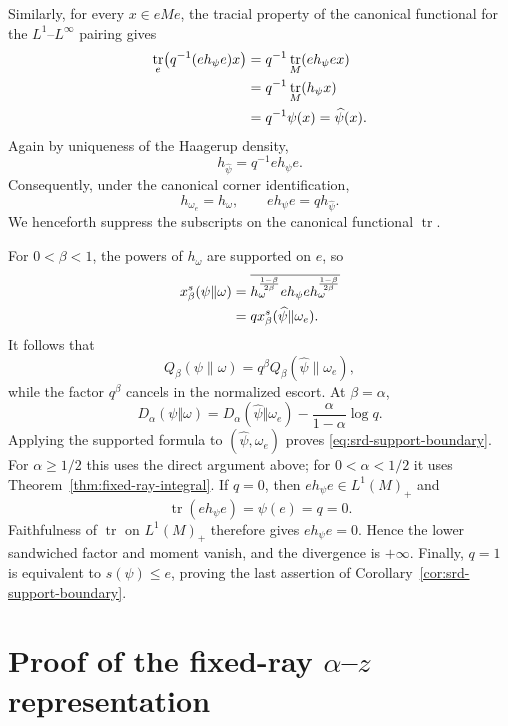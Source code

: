 \documentclass[12pt]{article}
\numberwithin{equation}{section}
\theoremstyle{definition}
\theoremstyle{remark}
\newcommand{\?}{\overset{?}{=}}
\DeclareMathOperator{\tr}{tr}
\begin{document}
Similarly, for every $x\in eMe$, the tracial property of the canonical
functional for the $L^1$--$L^\infty$ pairing gives
\begin{align}
  \tr_e\!\left(q^{-1}(e h_\psi e)x\right)
  &=
  q^{-1}\tr_M(eh_\psi e x) \notag\\
  &=
  q^{-1}\tr_M(h_\psi x) \notag\\
  &=
  q^{-1}\psi(x)
  =
  \widehat\psi(x).
  \label{eq:corner-density-pairing}
\end{align}
Again by uniqueness of the Haagerup density,
\[
  h_{\widehat\psi}=q^{-1}e h_\psi e.
\]
Consequently, under the canonical corner identification,
\begin{equation}
  h_{\omega_e}=h_\omega,
  \qquad
  e h_\psi e=q h_{\widehat\psi}.
  \label{eq:corner-density-scaling}
\end{equation}
We henceforth suppress the subscripts on the canonical functional $\tr$.

For $0<\beta<1$, the powers of $h_\omega$ are supported on $e$, so
\begin{align}
  x_\beta^s(\psi\|\omega)
  &=\overline{
  h_\omega^{\frac{1-\beta}{2\beta}}
  e h_\psi e
  h_\omega^{\frac{1-\beta}{2\beta}}}\notag\\
  &=q x_\beta^s(\widehat\psi\|\omega_e).
  \label{eq:corner-srd-factor}
\end{align}
It follows that
\begin{equation}
  Q_\beta(\psi\|\omega)
  =q^\beta Q_\beta(\widehat\psi\|\omega_e),
  \label{eq:corner-srd-moment}
\end{equation}
while the factor $q^\beta$ cancels in the normalized escort.  At
$\beta=\alpha$,
\begin{equation}
  D_\alpha(\psi\Vert\omega)
  =D_\alpha(\widehat\psi\Vert\omega_e)
   -\frac{\alpha}{1-\alpha}\log q.
  \label{eq:corner-srd-divergence}
\end{equation}
Applying the supported formula to $(\widehat\psi,\omega_e)$ proves
\eqref{eq:srd-support-boundary}.  For $\alpha\geq1/2$ this uses the direct
argument above; for $0<\alpha<1/2$ it uses
Theorem~\ref{thm:fixed-ray-integral}.  
If $q=0$, then $eh_\psi e\in L^1(M)_+$ and
\[
  \tr(eh_\psi e)=\psi(e)=q=0.
\]
Faithfulness of $\tr$ on $L^1(M)_+$ therefore gives
$eh_\psi e=0$.  Hence the lower sandwiched factor and moment vanish,
and the divergence is $+\infty$.
Finally,
$q=1$ is equivalent to $s(\psi)\leq e$, proving the last assertion of 
Corollary~\ref{cor:srd-support-boundary}.

\section{Proof of the fixed-ray \texorpdfstring{$\alpha$--$z$}{alpha-z}
representation}
\label{sec:proof-alpha-z}
\end{document}
